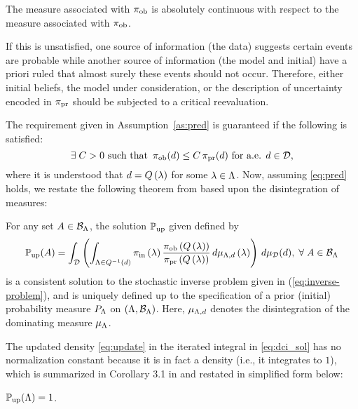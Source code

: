 \begin{assumption}\label{as:pred}
  The measure associated with $\operatorname*{\pi_{ob}}$ is absolutely continuous with respect to the measure associated with $\operatorname*{\pi_{ob}}$.
\end{assumption}

If this is unsatisfied, one source of information (the data) suggests certain events are probable while another source of information (the model and initial) have a priori ruled that almost surely these events should not occur. 
Therefore, either initial beliefs, the model under consideration, or the description of uncertainty encoded in $\operatorname*{\pi_{pr}}$ should be subjected to a critical reevaluation. 


The requirement given in Assumption~\ref{as:pred} is guaranteed if the following is satisfied:
\begin{equation}\label{eq:pred}
  \exists \; C>0 \text{ such that } \operatorname*{\pi_{ob}} (d) \leq C \operatorname*{\pi_{pr}}(d) \text{ for a.e. } d\in \mathcal{D},
\end{equation}
where it is understood that $d = Q\left ( \lambda \right )$ for some $\lambda \in {\Lambda}$.
Now, assuming \eqref{eq:pred} holds, we restate the following theorem from \cite{BJW18} based upon the disintegration of measures:


\begin{thm}
  For any set $A\in \mathcal{B}_{{\Lambda}}$, the solution $\operatorname*{\mathbb{P}_{up}}$ given defined by
  \begin{equation}\label{eq:dci_sol}
    \operatorname*{\mathbb{P}_{up}} (A) = \int_{\mathcal{D}} \left (  \int_{{\Lambda} \in Q^{-1}(d)}  \operatorname*{\pi_{in}}\left ( \lambda \right ) \frac{\operatorname*{\pi_{ob}}\left ( Q\left ( \lambda \right ) \right )}{\operatorname*{\pi_{pr}}\left ( Q\left ( \lambda \right ) \right )} \, d\mu_{{\Lambda}, d} \left ( \lambda \right ) \right ) \, d\mu_{\mathcal{D}}(d), \; \forall \; A \in \mathcal{B}_{{\Lambda}}
  \end{equation} 
  is a consistent solution to the stochastic inverse problem given in (\ref{eq:inverse-problem}), and is uniquely defined up to the specification of a prior (initial) probability measure $P_{\Lambda}$ on $({\Lambda}, \mathcal{B}_{{\Lambda}})$.
  Here, $\mu_{{\Lambda}, d}$ denotes the disintegration of the dominating measure $\mu_{\Lambda}$.
\end{thm}

The updated density \eqref{eq:update} in the iterated integral in \eqref{eq:dci_sol} has no normalization constant because it is in fact a density (i.e., it integrates to $1$), which is summarized in Corollary 3.1 in \cite{BJW18} and restated in simplified form below:
\begin{cor}\label{cor:int}
$\operatorname*{\mathbb{P}_{up}}({\Lambda}) = 1$.
\end{cor}

